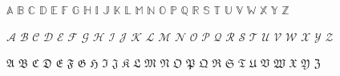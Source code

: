 \documentclass{article}
\begin{document}
$\mathbb{A}$
$\mathbb{B}$
$\mathbb{C}$
$\mathbb{D}$
$\mathbb{E}$
$\mathbb{F}$
$\mathbb{G}$
$\mathbb{H}$
$\mathbb{I}$
$\mathbb{J}$
$\mathbb{K}$
$\mathbb{L}$
$\mathbb{M}$
$\mathbb{N}$
$\mathbb{O}$
$\mathbb{P}$
$\mathbb{Q}$
$\mathbb{R}$
$\mathbb{S}$
$\mathbb{T}$
$\mathbb{U}$
$\mathbb{V}$
$\mathbb{W}$
$\mathbb{X}$
$\mathbb{Y}$
$\mathbb{Z}$

\newpage

$\mathcal{A}$
$\mathcal{B}$
$\mathcal{C}$
$\mathcal{D}$
$\mathcal{E}$
$\mathcal{F}$
$\mathcal{G}$
$\mathcal{H}$
$\mathcal{I}$
$\mathcal{J}$
$\mathcal{K}$
$\mathcal{L}$
$\mathcal{M}$
$\mathcal{N}$
$\mathcal{O}$
$\mathcal{P}$
$\mathcal{Q}$
$\mathcal{R}$
$\mathcal{S}$
$\mathcal{T}$
$\mathcal{U}$
$\mathcal{V}$
$\mathcal{W}$
$\mathcal{X}$
$\mathcal{Y}$
$\mathcal{Z}$
\newpage

$\mathfrak{A}$
$\mathfrak{B}$
$\mathfrak{C}$
$\mathfrak{D}$
$\mathfrak{E}$
$\mathfrak{F}$
$\mathfrak{G}$
$\mathfrak{H}$
$\mathfrak{I}$
$\mathfrak{J}$
$\mathfrak{K}$
$\mathfrak{L}$
$\mathfrak{M}$
$\mathfrak{N}$
$\mathfrak{O}$
$\mathfrak{P}$
$\mathfrak{Q}$
$\mathfrak{R}$
$\mathfrak{S}$
$\mathfrak{T}$
$\mathfrak{U}$
$\mathfrak{V}$
$\mathfrak{W}$
$\mathfrak{X}$
$\mathfrak{Y}$
$\mathfrak{Z}$
\end{document}
